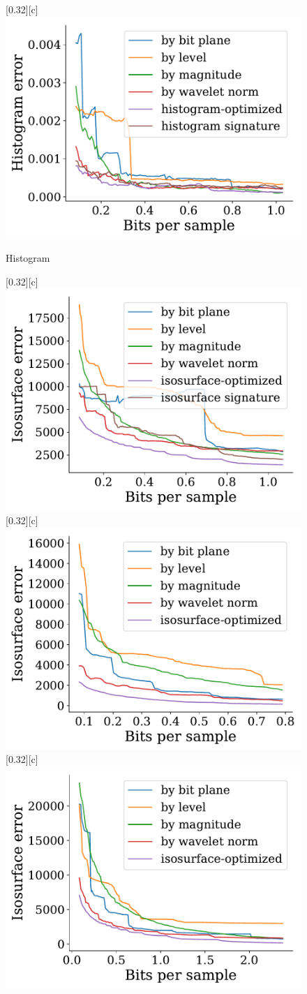 \documentclass{article}
\begin{document}
\begin{figure}[htb]
        [0.32\linewidth][c]{%
                \includegraphics[width=0.3\linewidth]{img/supplementary/histogram-optimized-karfs}}
        \caption{Histogram}
\end{figure}


\begin{figure}[htb]
        \centering
        [0.32\linewidth][c]{%
               \includegraphics[width=0.3\linewidth]{img/supplementary/isocontour-optimized-kingsnake}}
        [0.32\linewidth][c]{%
               \includegraphics[width=0.3\linewidth]{img/supplementary/isocontour-optimized-flame}}
        [0.32\linewidth][c]{%
               \includegraphics[width=0.3\linewidth]{img/supplementary/isocontour-optimized-csafe}}

\end{figure}
\end{document}
